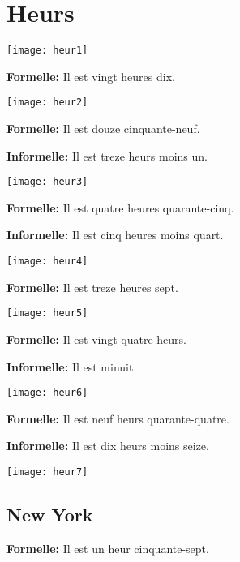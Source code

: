 \section{Heurs}

\begin{center}
    \texttt{[image: heur1]}
\end{center}

\textbf{Formelle:} Il est vingt heures dix.

\begin{center}
\texttt{[image: heur2]}
\end{center}

\textbf{Formelle:} Il est douze cinquante-neuf.

\textbf{Informelle:} Il est treze heurs moins un.

\begin{center}
    \texttt{[image: heur3]}
\end{center}

\textbf{Formelle:} Il est quatre heures quarante-cinq.

\textbf{Informelle:} Il est cinq heures moins quart.

\begin{center}
    \texttt{[image: heur4]}
\end{center}

\textbf{Formelle:} Il est treze heures sept.

\begin{center}
    \texttt{[image: heur5]}
\end{center}

\textbf{Formelle:} Il est vingt-quatre heurs.

\textbf{Informelle:} Il est minuit. 

\begin{center}
    \texttt{[image: heur6]}
\end{center}

\textbf{Formelle:} Il est neuf heurs quarante-quatre.

\textbf{Informelle:} Il est dix heurs moins seize.

\begin{center}
    \texttt{[image: heur7]}
\end{center}

\subsection*{New York}

\textbf{Formelle:} Il est un heur cinquante-sept.

